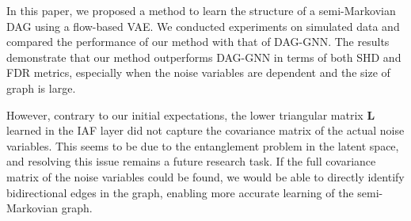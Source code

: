\documentclass[10pt]{article}
\begin{document}
In this paper, we proposed a method to learn the structure of a semi-Markovian DAG using a flow-based VAE. We conducted experiments on simulated data and compared the performance of our method with that of DAG-GNN. The results demonstrate that our method outperforms DAG-GNN in terms of both SHD and FDR metrics, especially when the noise variables are dependent and the size of graph is large.

However, contrary to our initial expectations, the lower triangular matrix $\mathbf L$ learned in the IAF layer did not capture the covariance matrix of the actual noise variables. This seems to be due to the entanglement problem in the latent space, and resolving this issue remains a future research task. If the full covariance matrix of the noise variables could be found, we would be able to directly identify bidirectional edges in the graph, enabling more accurate learning of the semi-Markovian graph.



\end{document}
